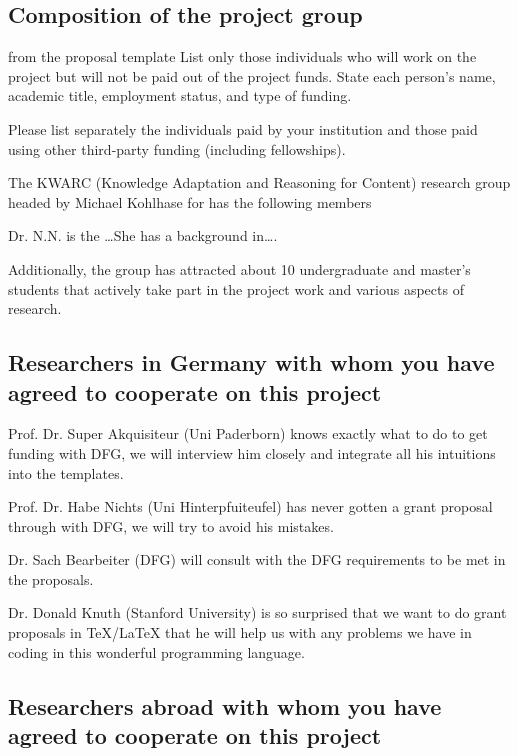 \subsection{Composition of the project group }
\begin{todo}{from the proposal template}
List only those individuals who will work on the project but will not be paid out of the
project funds. State each person’s name, academic title, employment status, and type
of funding.

Please list separately the individuals paid by your institution and those paid using other
third-party funding (including fellowships).
\end{todo}
The KWARC (Knowledge Adaptation and Reasoning for Content) research group headed by
Michael Kohlhase for has the following members
\begin{compactdesc}
\item[Dr. N.N.] is the \ldots She has a background in\ldots.
\end{compactdesc}
Additionally, the group has attracted about 10 undergraduate and master's students that
actively take part in the project work and various aspects of research.

\subsection{Researchers in Germany with whom you have agreed to cooperate on this project}

\begin{compactdesc}
\item[Prof. Dr. Super Akquisiteur (Uni Paderborn)] knows exactly what to do to get funding
  with DFG, we will interview him closely and integrate all his intuitions into the
  {\pn} templates.
\item[Prof. Dr. Habe Nichts (Uni Hinterpfuiteufel)] has never gotten a grant proposal
  through with DFG, we will try to avoid his mistakes.
\item[Dr. Sach Bearbeiter (DFG)] will consult with the DFG requirements to be met in the
  proposals.
\item[Dr. Donald Knuth (Stanford University)] is so surprised that we want to do grant
  proposals in {\TeX/\LaTeX} that he will help us with any problems we have in coding in
  this wonderful programming language.
\end{compactdesc}

\subsection{Researchers abroad with whom you have agreed to cooperate on this project}

